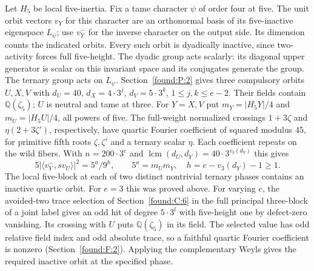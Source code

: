 \documentclass[11pt,a4paper]{article}
\numberwithin{equation}{section}
\theoremstyle{remark}
\newcommand{\QQ}{\mathbb Q}
\newcommand{\lcm}{\operatorname{lcm}}
\begin{document}
Let $H_5$ be local five-inertia. Fix a tame character $\psi$ of order four at five. The unit orbit vectors $v_Y$ for this character are an orthonormal basis of its five-inactive eigenspace $L_\psi$; use $v_Y^-$ for the inverse character on the output side. Its dimension counts the indicated orbits. Every such orbit is dyadically inactive, since two-activity forces full five-height. The dyadic group acts scalarly: its diagonal upper generator is scalar on this invariant space and its conjugates generate the group. The ternary group acts on $L_\psi$. Section~\ref{found:P:2} gives three compulsory orbits $U,X,V$ with $d_U=40$, $d_X=4\cdot3^j$, $d_V=5\cdot3^k$, $1\le j,k\le e-2$. Their fields contain $\QQ(\zeta_5)$; $U$ is neutral and tame at three. For $Y=X,V$ put $m_Y=|H_5Y|/4$ and $m_U=|H_5U|/4$, all powers of five. The full-weight normalized crossings $1+3\zeta$ and $\eta(2+3\zeta')$, respectively, have quartic Fourier coefficient of squared modulus $45$, for primitive fifth roots $\zeta,\zeta'$ and a ternary scalar $\eta$. Each coefficient repeats on the wild fibers. With $n=200\cdot3^e$ and $\lcm(d_U,d_Y)=40\cdot3^{v_3(d_Y)}$ this gives
\[
  5|\langle v_Y^-,s v_U\rangle|^2
    =5^a/9^h,\qquad 5^a=m_Um_Y,\quad h=e-v_3(d_Y)-1\ge1.
\]
The local five-block at each of two distinct nontrivial ternary phases contains an inactive quartic orbit. For $e=3$ this was proved above. For varying $e$, the avoided-two trace selection of Section~\ref{found:C:6} in the full principal three-block of a joint label gives an odd hit of degree $5\cdot3^l$ with five-height one by defect-zero vanishing. Its crossing with $U$ puts $\QQ(\zeta_5)$ in its field. The selected value has odd relative field index and odd absolute trace, so a faithful quartic Fourier coefficient is nonzero (Section~\ref{found:F:2}). Applying the complementary Weyls gives the required inactive orbit at the specified phase.
\end{document}
